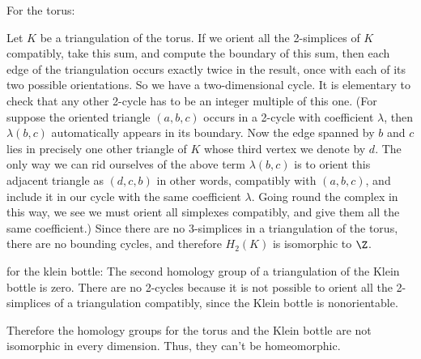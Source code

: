 For the torus\parencite[p. 180f.]{ar}:

Let $K$ be a triangulation of the torus. If we orient all the 2-simplices of $K$ compatibly, take this sum, and compute the boundary of this sum, then  each edge of the triangulation occurs exactly twice in the result, once with each of its two possible orientations. So we have a two-dimensional cycle. It is elementary to check that any other 2-cycle has to be an integer multiple of this one. (For suppose the oriented triangle $(a,b,c)$ occurs in a 2-cycle with coefficient $\lambda$, then $\lambda(b,c)$ automatically appears in its boundary. Now the edge spanned by $b$ and $c$ lies in precisely one other triangle of $K$ whose third vertex we denote by $d$. The only way we can rid ourselves of the above term $\lambda(b,c)$ is to orient this adjacent triangle as $(d,c,b)$ in other words, compatibly with $(a,b,c)$, and include it in our cycle with the same coefficient $\lambda$. Going round the complex in this way, we see we must orient all simplexes compatibly, and give them all the same coefficient.) Since there are no 3-simplices in a triangulation of the torus, there are no bounding cycles, and therefore $H_2(K)$ is isomorphic to $\Z$.


for the klein bottle:
The second homology group of a triangulation of the Klein bottle is zero. There are no 2-cycles because it is not possible to orient all the 2-simplices of a triangulation compatibly, since the Klein bottle is nonorientable.

Therefore the homology groups for the torus and the Klein bottle are not isomorphic in every dimension. Thus, they can't be homeomorphic.
